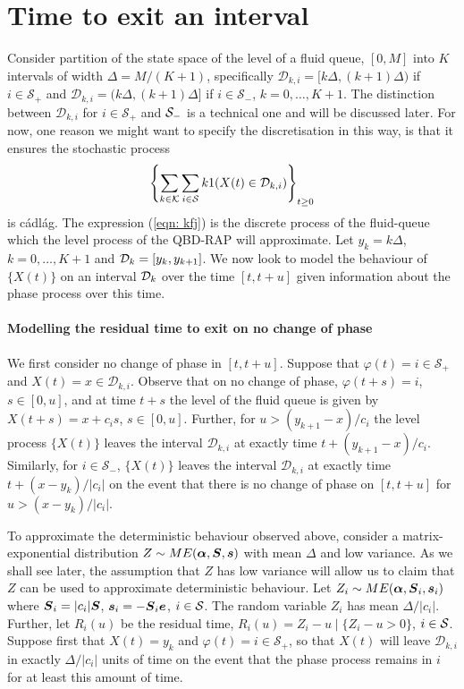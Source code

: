 \section{Time to exit an interval}\label{sec: modelling}
Consider partition of the state space of the level of a fluid queue, \([0,M]\) into \(K\) intervals of width \(\Delta = M/(K+1)\), specifically \(\mathcal D_{k,i} = [k\Delta,(k+1)\Delta)\) if \(i\in\mathcal S_+\) and \(\mathcal D_{k,i} = (k\Delta,(k+1)\Delta]\) if \(i\in\mathcal S_-\), \(k=0,\dots,K+1\). The distinction between \(\mathcal D_{k,i}\) for \(i\in\mathcal S_+\) and \(\mathcal{S}_-\) is a technical one and will be discussed later. For now, one reason we might want to specify the discretisation in this way, is that it ensures the stochastic process 
\begin{align}
	\displaystyle \left\{\sum_{k\in\mathcal K}\sum_{i\in\mathcal{S}} k1(X(t)\in\mathcal{D}_{k,i})\right\}_{t\geq 0} \label{eqn: kfj}
\end{align}
is c\'adl\'ag. The expression (\ref{eqn: kfj}) is the discrete process of the fluid-queue which the level process of the QBD-RAP will approximate. Let \(y_k = k\Delta\), \(k=0,\dots,K+1\) and \(\mathcal{D}_k = [y_k,y_{k+1}]\). We now look to model the behaviour of \(\{X(t)\}\) on an interval \(\mathcal{D}_k\) over the time \([t,t+u]\) given information about the phase process over this time. 

\paragraph{Modelling the residual time to exit on no change of phase} 
We first consider no change of phase in \([t,t+u]\). Suppose that \(\varphi(t)=i\in\mathcal S_+\) and \(X(t) = x\in\mathcal D_{k,i}\). Observe that on no change of phase, \(\varphi(t+s) = i\), \(s\in[0,u]\), and at time \(t+s\) the level of the fluid queue is given by \(X(t+s) = x+c_i s\), \(s\in[0,u]\). Further, for \(u>(y_{k+1}-x)/c_i\) the level process \(\{X(t)\}\) leaves the interval \(\mathcal D_{k,i}\) at exactly time \(t+(y_{k+1} - x)/c_i\). Similarly, for \(i\in\mathcal S_-\), \(\{X(t)\}\) leaves the interval \(\mathcal D_{k,i}\) at exactly time \(t+(x-y_k)/|c_i|\) on the event that there is no change of phase on \([t,t+u]\) for \(u>(x-y_k)/|c_i|\). 

To approximate the deterministic behaviour observed above, consider a matrix-exponential distribution \(Z\sim ME(\boldsymbol \alpha, \boldsymbol S, \boldsymbol s)\) with mean \(\Delta\) and low variance. As we shall see later, the assumption that \(Z\) has low variance will allow us to claim that \(Z\) can be used to approximate deterministic behaviour. Let \(Z_i\sim ME(\boldsymbol \alpha, \boldsymbol S_i, \boldsymbol s_i)\) where \(\boldsymbol S_i = |c_i|\boldsymbol S\), \(\boldsymbol s_i=-\boldsymbol S_i\boldsymbol e\), \(i\in\mathcal{S}\). The random variable \(Z_i\) has mean \(\Delta/|c_i|\). Further, let \(R_i(u)\) be the residual time, \(R_i(u) = Z_i-u\mid \{Z_i-u>0\}\), \(i\in\mathcal{S}\). Suppose first that \(X(t)=y_k\) and \(\varphi(t)=i\in\mathcal S_+\), so that \(X(t)\) will leave \(\mathcal D_{k,i}\) in exactly \(\Delta/|c_i|\) units of time on the event that the phase process remains in \(i\) for at least this amount of time. 

